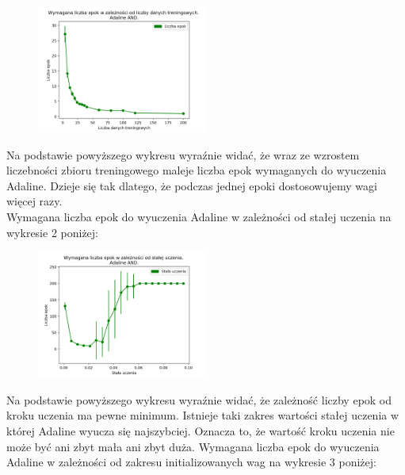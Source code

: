 \documentclass{article}
\begin{document}
	\begin{figure}[h]

		\centering
		\caption{}
		\includegraphics[width=0.5\textwidth]{epoki_dane_adaline_and.png}
		
	\end{figure}	 
	Na podstawie powyższego wykresu wyraźnie widać, że wraz ze wzrostem liczebności zbioru treningowego maleje liczba epok wymaganych do wyuczenia Adaline. Dzieje się tak dlatego, że podczas jednej epoki dostosowujemy wagi więcej razy.\\[0.5cm] 
	
	Wymagana liczba epok do wyuczenia Adaline w zależności od stałej uczenia na wykresie 2 poniżej:
	
	\begin{figure}[h]

		\centering
		\caption{}
		\includegraphics[width=0.5\textwidth]{epoki_rate_adaline.png}
		
	\end{figure}   
	Na podstawie powyższego wykresu wyraźnie widać, że zależność liczby epok od kroku uczenia ma pewne minimum. Istnieje taki zakres wartości stałej uczenia w której Adaline wyucza się najszybciej. Oznacza to, że wartość kroku uczenia nie może być ani zbyt mała ani zbyt duża.
	\newpage
	Wymagana liczba epok do wyuczenia Adaline w zależności od zakresu initializowanych wag na wykresie 3 poniżej:
	
\end{document}
